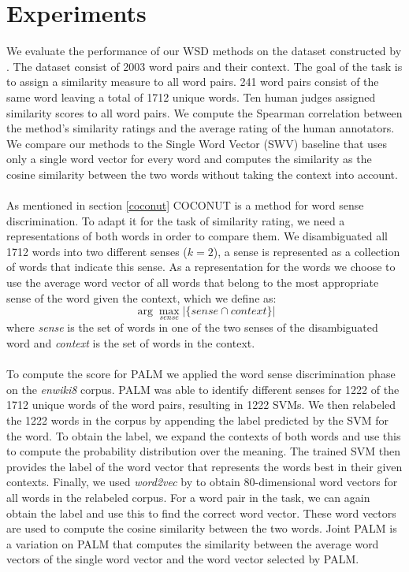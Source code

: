 \documentclass[11pt]{article}
\begin{document}
\section{Experiments}
We evaluate the performance of our WSD methods on the dataset constructed by \cite{global}. The dataset consist of 2003 word pairs and their context. The goal of the task is to assign a similarity measure to all word pairs. 241 word pairs consist of the same word leaving a total of 1712 unique words. Ten human judges assigned similarity scores to all word pairs. We compute the Spearman correlation between the method's similarity ratings and the average rating of the human annotators. We compare our methods to the Single Word Vector (SWV) baseline that uses only a single word vector for every word and computes the similarity as the cosine similarity between the two words without taking the context into account. \\\\
As mentioned in section \ref{coconut} COCONUT is a method for word sense discrimination. To adapt it for the task of similarity rating, we need a representations of both words in order to compare them. We disambiguated all 1712 words into two different senses ($k = 2$), a sense is represented as a collection of words that indicate this sense. As a representation for the words we choose to use the average word vector of all words that belong to the most appropriate sense of the word given the context, which we define as:
\begin{equation}\label{sense} \arg\max_{\textit{sense}}  | \{\textit{sense} \cap \textit{context}\} |\end{equation}
where \textit{sense} is the set of words in one of the two senses of the disambiguated word and \textit{context} is the set of words in the context.\\\\
To compute the score for PALM we applied the word sense discrimination phase on the \textit{enwiki8} corpus. PALM was able to identify different senses for 1222 of the 1712 unique words of the word pairs, resulting in 1222 SVMs. We then relabeled the 1222 words in the corpus by appending the label predicted by the SVM for the word. To obtain the label, we expand the contexts of both words and use this to compute the probability distribution over the meaning. The trained SVM then provides the label of the word vector that represents the words best in their given contexts. Finally, we used \textit{word2vec} by \cite{word2vec} to obtain 80-dimensional word vectors for all words in the relabeled corpus. For a word pair in the task, we can again obtain the label and use this to find the correct word vector. These word vectors are used to compute the cosine similarity between the two words. Joint PALM is a variation on PALM that computes the similarity between the average word vectors of the single word vector and the word vector selected by PALM.
\end{document}
